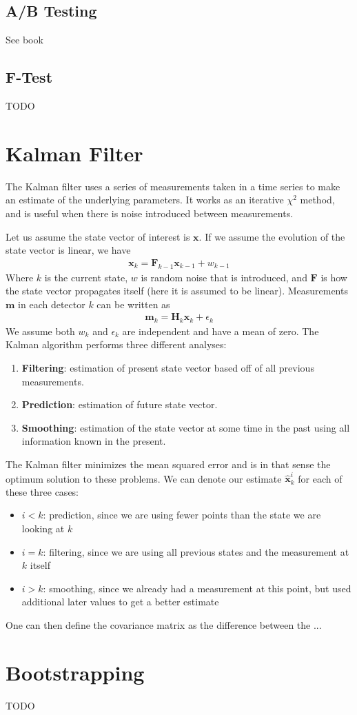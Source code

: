 \subsection{A/B Testing}
See book \cite{grus}


\subsection{F-Test}
TODO

\section{Kalman Filter}
The Kalman filter\cite{fruwirth} uses a series of measurements taken in a time series to make an estimate of the underlying parameters. It works as an iterative $\chi^2$ method, and is useful when there is noise introduced between measurements.

Let us assume the state vector of interest is $\textbf{x}$. If we assume the evolution of the state vector is linear, we have
\begin{align}
    \textbf{x}_k = \textbf{F}_{k-1}\textbf{x}_{k-1} + w_{k-1}
\end{align}
Where $k$ is the current state, $w$ is random noise that is introduced, and $\textbf{F}$ is how the state vector propagates itself (here it is assumed to be linear). Measurements $\textbf{m}$ in each detector $k$ can be written as
\begin{align}
    \textbf{m}_k = \textbf{H}_k\textbf{x}_k + \epsilon_k
\end{align}
We assume both $w_k$ and $\epsilon_k$ are independent and have a mean of zero. The Kalman algorithm performs three different analyses:
\begin{enumerate}
    \item \textbf{Filtering}: estimation of present state vector based off of all previous measurements.
    \item \textbf{Prediction}: estimation of future state vector.
    \item \textbf{Smoothing}: estimation of the state vector at some time in the past using all information known in the present.
\end{enumerate}
The Kalman filter minimizes the mean squared error and is in that sense the optimum solution to these problems. We can denote our estimate $\hat{\textbf{x}}_k^i$ for each of these three cases:
\begin{itemize}
    \item $i < k$: prediction, since we are using fewer points than the state we are looking at $k$
    \item $i=k$: filtering, since we are using all previous states and the measurement at $k$ itself
    \item $i > k$: smoothing, since we already had a measurement at this point, but used additional later values to get a better estimate
\end{itemize}
One can then define the covariance matrix as the difference between the ...



\section{Bootstrapping}
TODO



